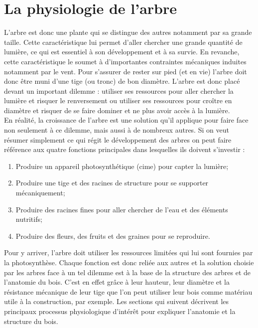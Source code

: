 \section{La physiologie de l'arbre}

L'arbre est donc une plante qui se distingue des autres notamment par sa grande taille. Cette caractéristique lui permet d'aller chercher une grande quantité de lumière, ce qui est essentiel à son développement et à sa survie. En revanche, cette caractéristique le soumet à d'importantes contraintes mécaniques induites notamment par le vent. Pour s'assurer de rester sur pied (et en vie) l'arbre doit donc être muni d'une tige (ou tronc) de bon diamètre. L'arbre est donc placé devant un important dilemme : utiliser ses ressources pour aller chercher la lumière et risquer le renversement ou utiliser ses ressources pour croître en diamètre et risquer de se faire dominer et ne plus avoir accès à la lumière.\\  

En réalité, la croissance de l'arbre est une solution qu'il applique pour faire face non seulement à ce dilemme, mais aussi à de nombreux autres. Si on veut résumer simplement ce qui régit le développement des arbres on peut faire référence aux quatre fonctions principales dans lesquelles ils doivent s'investir : 

\begin{enumerate}
\item Produire un appareil photosynthétique (cime) pour capter la lumière; 
\item Produire une tige et des racines de structure pour se supporter mécaniquement; 
\item Produire des racines fines pour aller chercher de l'eau et des éléments nutritifs; 
\item Produire des fleurs, des fruits et des graines pour se reproduire. 
\end{enumerate}

Pour y arriver, l'arbre doit utiliser les ressources limitées qui lui sont fournies par la photosynthèse. Chaque fonction est donc reliée aux autres et la solution \og choisie \fg par les arbres face à un tel dilemme est à la base de la structure des arbres et de l'anatomie du bois. C'est en effet grâce à leur hauteur, leur diamètre et la résistance mécanique de leur tige que l'on peut utiliser leur bois comme matériau utile à la construction, par exemple. Les sections qui suivent décrivent les principaux processus physiologique d'intérêt pour expliquer l'anatomie et la structure du bois. 

